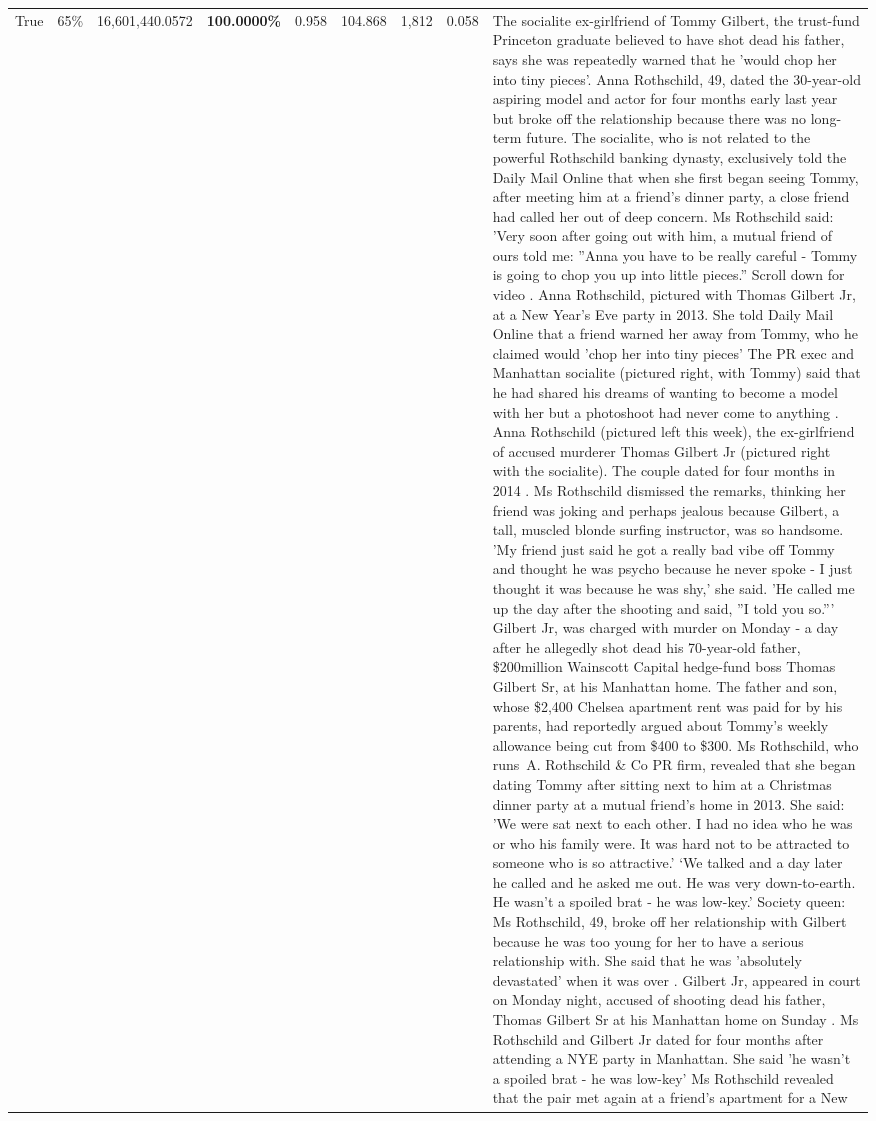 \begin{table}[H]
\begin{tabular}{lllrlllll}
True & 65\% & 16,601,440.0572 & \bfseries \color{red} 100.0000\% & 0.958 & 104.868 & 1,812 & 0.058 & The socialite ex-girlfriend of Tommy Gilbert, the trust-fund Princeton graduate believed to have shot dead his father, says she was repeatedly warned that he 'would chop her into tiny pieces'. Anna Rothschild, 49, dated the 30-year-old aspiring model and actor for four months early last year but broke off the relationship because there was no long-term future. The socialite, who is not related to the powerful Rothschild banking dynasty, exclusively told the Daily Mail Online that when she first began seeing Tommy, after meeting him at a friend's dinner party, a close friend had called her out of deep concern. Ms Rothschild said: 'Very soon after going out with him, a mutual friend of ours told me: ''Anna you have to be really careful - Tommy is going to chop you up into little pieces.'' Scroll down for video . Anna Rothschild, pictured with Thomas Gilbert Jr, at a New Year's Eve party in 2013. She told Daily Mail Online that a friend warned her away from Tommy, who he claimed would 'chop her into tiny pieces' The PR exec and Manhattan socialite (pictured right, with Tommy) said that he had shared his dreams of wanting to become a model with her but a photoshoot had never come to anything . Anna Rothschild (pictured left this week), the ex-girlfriend of accused murderer Thomas Gilbert Jr (pictured right with the socialite). The couple dated for four months in 2014 . Ms Rothschild dismissed the remarks, thinking her friend was joking and perhaps jealous because Gilbert, a tall, muscled blonde surfing instructor, was so handsome. 'My friend just said he got a really bad vibe off Tommy and thought he was psycho because he never spoke - I just thought it was because he was shy,' she said. 'He called me up the day after the shooting and said, ''I told you so.''' Gilbert Jr, was charged with murder on Monday - a day after he allegedly shot dead his 70-year-old father, \$200million Wainscott Capital hedge-fund boss Thomas Gilbert Sr, at his Manhattan home. The father and son, whose \$2,400 Chelsea apartment rent was paid for by his parents, had reportedly argued about Tommy's weekly allowance being cut from \$400 to \$300. Ms Rothschild, who runs A. Rothschild \& Co PR firm, revealed that she began dating Tommy after sitting next to him at a Christmas dinner party at a mutual friend's home in 2013. She said: 'We were sat next to each other. I had no idea who he was or who his family were. It was hard not to be attracted to someone who is so attractive.' ‘We talked and a day later he called and he asked me out. He was very down-to-earth. He wasn’t a spoiled brat - he was low-key.’ Society queen: Ms Rothschild, 49, broke off her relationship with Gilbert because he was too young for her to have a serious relationship with. She said that he was 'absolutely devastated' when it was over . Gilbert Jr, appeared in court on Monday night, accused of shooting dead his father, Thomas Gilbert Sr at his Manhattan home on Sunday . Ms Rothschild and Gilbert Jr dated for four months after attending a NYE party in Manhattan. She said 'he wasn't a spoiled brat - he was low-key' Ms Rothschild revealed that the pair met again at a friend’s apartment for a New 
\end{tabular}
\end{table}
